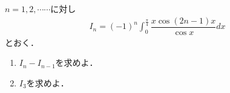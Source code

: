 \documentclass[../../main.tex]{subfiles}
\begin{document}
$n=1,2,\cdots\cdots$に対し
\begin{align}
  I_n=(-1)^n\int_0^{\frac{\pi}{4}}\dfrac{x \cos (2n-1)x}{\cos x}dx
\end{align}
とおく．
\begin{enumerate}
  \item $I_n-I_{n-1}$を求めよ．
  \item $I_3$を求めよ．
\end{enumerate}
\end{document}
